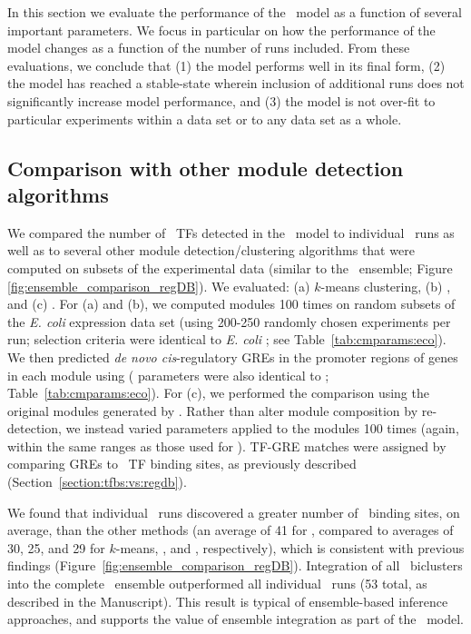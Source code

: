 In this section we evaluate the performance of the \egrine\ model as a function
of several important parameters. We focus in particular on how the
performance of the model changes as a function of the number of runs
included. From these evaluations, we conclude that (1) the model
performs well in its final form, (2) the model has reached a stable-state 
wherein inclusion of additional runs does not significantly increase model
performance, and (3) the model is not over-fit to particular
experiments within a data set or to any data set as a whole.

\subsection{Comparison with other module detection algorithms}

We compared the number of \rdb~TFs detected in the \egrine~model to individual
\cm~runs as well as to several other module detection/clustering
algorithms that were computed on subsets of the experimental data
(similar to the \egrine~ensemble; Figure \ref{fig:ensemble_comparison_regDB}). We
evaluated: (a) $k$-means clustering, (b) 
\cite{Langfelder2008}, and (c) 
\cite{Lemmens2009}. For (a) and (b), we computed modules 100 times on
random subsets of the {\it E. coli} expression data set (using 200-250
randomly chosen experiments per run; selection criteria were identical
to {\it E. coli} \egrine; see Table~\ref{tab:cmparams:eco}). We then
predicted {\it de novo cis}-regulatory GREs in the promoter regions of genes
in each module using  ( parameters were also
identical to \egrine; Table~\ref{tab:cmparams:eco}). For (c), we
performed the comparison using the original modules generated by
\cite{Lemmens2009}. Rather than alter module composition by
re-detection, we instead varied  parameters applied to
the modules 100 times (again, within the same ranges as those used for
\egrine). TF-GRE matches were assigned by comparing GREs to
\rdb~TF binding sites, as previously described
(Section~\ref{section:tfbs:vs:regdb}).

We found that individual \cm~runs discovered a greater number of
\rdb~binding sites, on average, than the other methods (an average of
41 for \cm, compared to averages of 30, 25, and 29 for $k$-means,
, and , respectively), which is
consistent with previous findings \cite{Reiss2006n}
(Figure~\ref{fig:ensemble_comparison_regDB}). Integration of all
\cm~biclusters into the complete \egrine~ensemble outperformed all
individual \cm~runs (53 total, as described in the Manuscript). This
result is typical of ensemble-based inference approaches, and supports
the value of ensemble integration as part of the \egrine\ model.

